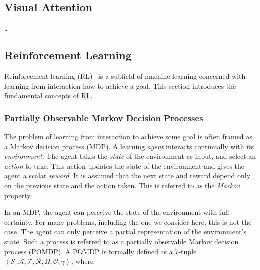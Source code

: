
\subsection{Visual Attention}

\dots

\subsection{Reinforcement Learning}



Reinforcement learning (RL)~\cite{sutton_reinforcement_2018} is a subfield of machine learning concerned with learning from interaction how to achieve a goal.
This section introduces the fundamental concepts of RL.

\subsubsection{Partially Observable Markov Decision Processes}

The problem of learning from interaction to achieve some goal is often framed as a Markov decision process (MDP).
A learning \textit{agent} interacts continually with its \textit{environment}.
The agent takes the \textit{state} of the environment as input, and select an \textit{action} to take.
This action updates the state of the environment and gives the agent a scalar \textit{reward}.
It is assumed that the next state and reward depend only on the previous state and the action taken.
This is referred to as the \textit{Markov} property.~\cite{kaelbling_pomdp_1998}

In an MDP, the agent can perceive the state of the environment with full certainty.
For many problems, including the one we consider here, this is not the case.
The agent can only perceive a partial representation of the environment's state.
Such a process is referred to as a partially observable Markov decision process (POMDP).
A POMDP is formally defined as a 7-tuple \(\left\langle \mathcal{S}, \mathcal{A}, \mathcal{T}, \mathcal{R}, \Omega, \mathcal{O}, \gamma \right\rangle\), where

